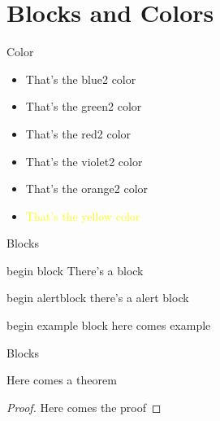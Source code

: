 \section{Blocks and Colors}
 \frame{\sectionpage}

\begin{frame}{Color}

\begin{itemize}
    \item \textcolor{blue2}{That's the blue2 color}
    \item \textcolor{green2}{That's the green2 color}
    \item \textcolor{red2}{That's the red2 color}
    \item \textcolor{violet2}{That's the violet2 color}
    \item \textcolor{orange2}{That's the orange2 color}
    \item \textcolor{yellow}{That's the yellow color}
\end{itemize}
    
\end{frame}

\begin{frame}{Blocks}
\begin{block}{begin block}
There's a block
\end{block}

\begin{alertblock}{begin alertblock}
    there's a alert block 
\end{alertblock}

\begin{exampleblock}{begin example block}
here comes example
\end{exampleblock} 

\end{frame}


\begin{frame}{Blocks}
    
\begin{theorem}
    Here comes a theorem
\end{theorem}

\begin{proof}
    Here comes the proof
\end{proof}


    
\end{frame}

